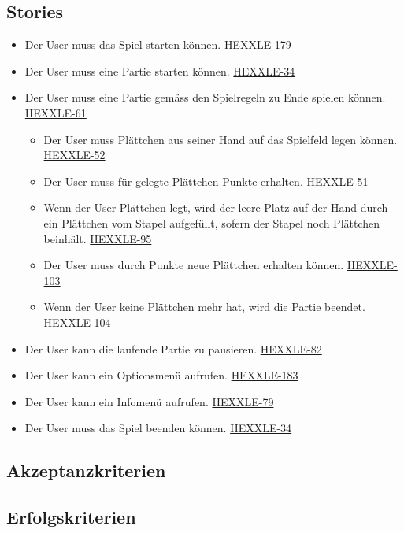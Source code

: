 \documentclass[../main.tex]{subfiles}
\begin{document}
    \subsection{Stories}
    \begin{itemize}
    	\item Der User muss das Spiel starten können. \href{https://hexxle.atlassian.net/browse/HEXXLE-179}{HEXXLE-179}
    	\item Der User muss eine Partie starten können. \href{https://hexxle.atlassian.net/browse/HEXXLE-34}{HEXXLE-34}
    	\item Der User muss eine Partie gemäss den Spielregeln zu Ende spielen können. \href{https://hexxle.atlassian.net/browse/HEXXLE-61}{HEXXLE-61}
    	\begin{itemize}
    		\item Der User muss Plättchen aus seiner Hand auf das Spielfeld legen können. \href{https://hexxle.atlassian.net/browse/HEXXLE-52}{HEXXLE-52}
    		\item Der User muss für gelegte Plättchen Punkte erhalten. \href{https://hexxle.atlassian.net/browse/HEXXLE-51}{HEXXLE-51}
    		\item Wenn der User Plättchen legt, wird der leere Platz auf der Hand durch ein Plättchen vom Stapel aufgefüllt, sofern der Stapel noch Plättchen beinhält.
    		\href{https://hexxle.atlassian.net/browse/HEXXLE-95}{HEXXLE-95}
    		\item Der User muss durch Punkte neue Plättchen erhalten können. \href{https://hexxle.atlassian.net/browse/HEXXLE-103}{HEXXLE-103}
    		\item Wenn der User keine Plättchen mehr hat, wird die Partie beendet. \href{https://hexxle.atlassian.net/browse/HEXXLE-104}{HEXXLE-104}
    	\end{itemize}
    	\item Der User kann die laufende Partie zu pausieren. \href{https://hexxle.atlassian.net/browse/HEXXLE-82}{HEXXLE-82}
    	\item Der User kann ein Optionsmenü aufrufen. \href{https://hexxle.atlassian.net/browse/HEXXLE-183}{HEXXLE-183}
    	\item Der User kann ein Infomenü aufrufen. \href{https://hexxle.atlassian.net/browse/HEXXLE-79}{HEXXLE-79}
    	\item Der User muss das Spiel beenden können. \href{https://hexxle.atlassian.net/browse/HEXXLE-34}{HEXXLE-34}
    \end{itemize}

	\subsection{Akzeptanzkriterien}

	\subsection{Erfolgskriterien}
\end{document}
